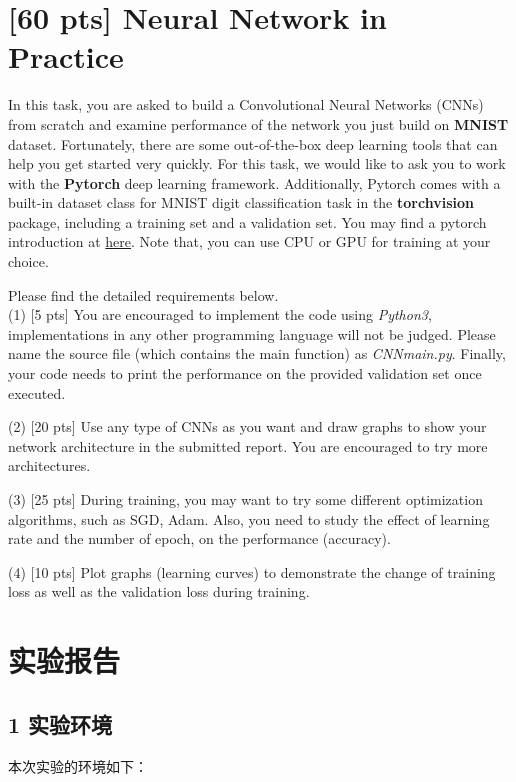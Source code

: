 \documentclass[a4paper,utf8]{article}
\begin{document}
	\newpage
	\section{[60 pts] Neural Network in Practice}
	
	\noindent In this task, you are asked to build a Convolutional Neural Networks (CNNs) from scratch and examine performance of the network you just build on \textbf{MNIST} dataset.
	Fortunately, there are some out-of-the-box deep learning tools that can help you get started very quickly. For this task, we would like to ask you to work with the \textbf{Pytorch} deep learning framework. Additionally, Pytorch comes with a built-in dataset class for MNIST digit classification task in the \textbf{torchvision} package, including a training set and a validation set. You may find a pytorch introduction at \href{https://pytorch.org/tutorials/beginner/blitz/cifar10_tutorial.html}{here}. Note that, you can use CPU or GPU for training at your choice.
	
	Please find the detailed requirements below.\\

	(1) [5 pts] You are encouraged to implement the code using \emph{Python3}, implementations in any other programming language will not be judged. Please name the source file (which contains the main function) as \emph{CNN\underline{\hspace{0.5em}}main.py}. Finally, your code needs to print the performance on the provided validation set once executed.

	(2) [20 pts] Use any type of CNNs as you want and draw graphs to show your network architecture in the submitted report. You are encouraged to try more architectures.

	(3) [25 pts] During training, you may want to try some different optimization algorithms, such as SGD, Adam. Also, you need to study the effect of learning rate and the number of epoch, on the performance (accuracy).
		    
	(4) [10 pts] Plot graphs (learning curves) to demonstrate the change of training loss as well as the validation loss during training.


	\newpage
	\section*{实验报告}
	\subsection*{1 实验环境}
	本次实验的环境如下：
\end{document}
